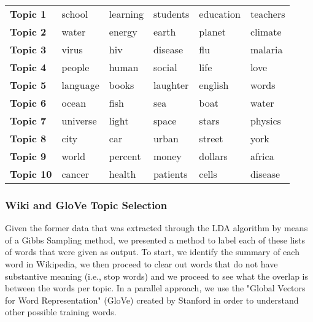 \documentclass[letterpaper, 11pt]{article}
\begin{document}
\medskip
\begin{minipage}{\linewidth}
\centering
{} \label{tab:title}
\begin{tabular}{llllll}
\toprule
\bf{Topic 1}  &    school &     learning &      students &  education &   teachers \\
\bf{Topic 2}  &     water &    energy &        earth &        planet &    climate  \\
\bf{Topic 3}  &     virus &       hiv &      disease &           flu &    malaria  \\
\bf{Topic 4}  &    people &     human &       social &          life &       love  \\
\bf{Topic 5}  &  language &     books &     laughter &       english &       words \\
\bf{Topic 6}  &     ocean &      fish &          sea &          boat &       water \\
\bf{Topic 7}  &  universe &     light &        space &         stars &     physics \\
\bf{Topic 8}  &       city &       car &         urban &       street &       york  \\
\bf{Topic 9}  &      world &   percent &         money &      dollars &     africa  \\
\bf{Topic 10} &    cancer &    health &     patients &         cells &    disease  \\
\bottomrule
\end{tabular}\par
\medskip
\end{minipage}


\justify

\subsubsection{Wiki and GloVe Topic
Selection}\label{wiki-and-glove-topic-selection}

Given the former data that was extracted through the LDA algorithm by means of a Gibbs Sampling method, we presented a method to label each of these lists of words that were given as output. To start, we identify the summary of each word in Wikipedia, we then proceed to clear out words that do not have substantive meaning (i.e., stop words) and we proceed to see what the overlap is between the words per topic. In a parallel approach, we use the "Global Vectors for Word Representation" (GloVe) created by Stanford in order to understand other possible training words.
\end{document}
